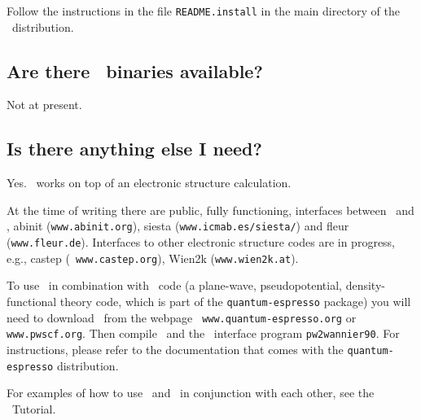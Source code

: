 Follow the instructions in the file {\tt README.install} in the main
directory of the \wannier\ distribution.

\subsection{Are there \wannier\ binaries available?}

Not at present.

\subsection{Is there anything else I need?}

Yes. \wannier\ works on top of an electronic structure
calculation. 

At the time of writing there are public, fully functioning, interfaces
between \wannier\ and \pwscf,  {\sc abinit} ({\tt www.abinit.org}), {\sc siesta} ({\tt www.icmab.es/siesta/})
and {\sc fleur} ({\tt www.fleur.de}). Interfaces to other
electronic structure codes are in progress, e.g., {\sc castep} ({\tt
  www.castep.org}), {\sc Wien2k} ({\tt www.wien2k.at}).

To use 
\wannier\ in combination with 
\pwscf\ code (a plane-wave, pseudopotential, density-functional theory
code, which is part of the {\tt quantum-espresso} package) you 
will need to download \pwscf\ from the webpage {\tt
  www.quantum-espresso.org} or {\tt www.pwscf.org}. Then compile \pwscf\
and the \wannier\ interface program {\tt pw2wannier90}. For
instructions, please refer to the
documentation that comes with the {\tt quantum-espresso} distribution.

For examples of how to use \pwscf\ and \wannier\ in conjunction with
each other, see the \wannier\ Tutorial.






